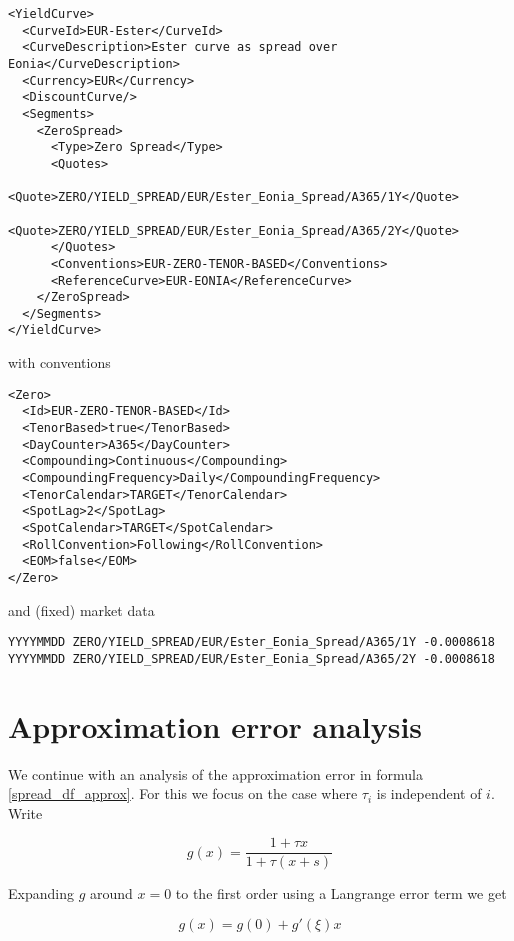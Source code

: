 \documentclass[12pt, a4paper]{article}
\begin{document}
\begin{verbatim}
<YieldCurve>
  <CurveId>EUR-Ester</CurveId>
  <CurveDescription>Ester curve as spread over Eonia</CurveDescription>
  <Currency>EUR</Currency>
  <DiscountCurve/>
  <Segments>
    <ZeroSpread>
      <Type>Zero Spread</Type>
      <Quotes>
        <Quote>ZERO/YIELD_SPREAD/EUR/Ester_Eonia_Spread/A365/1Y</Quote>
        <Quote>ZERO/YIELD_SPREAD/EUR/Ester_Eonia_Spread/A365/2Y</Quote>
      </Quotes>
      <Conventions>EUR-ZERO-TENOR-BASED</Conventions>
      <ReferenceCurve>EUR-EONIA</ReferenceCurve>
    </ZeroSpread>
  </Segments>
</YieldCurve>
\end{verbatim}

with conventions

\begin{verbatim}
<Zero>
  <Id>EUR-ZERO-TENOR-BASED</Id>
  <TenorBased>true</TenorBased>
  <DayCounter>A365</DayCounter>
  <Compounding>Continuous</Compounding>
  <CompoundingFrequency>Daily</CompoundingFrequency>
  <TenorCalendar>TARGET</TenorCalendar>
  <SpotLag>2</SpotLag>
  <SpotCalendar>TARGET</SpotCalendar>
  <RollConvention>Following</RollConvention>
  <EOM>false</EOM>
</Zero>
\end{verbatim}

and (fixed) market data

\begin{verbatim}
YYYYMMDD ZERO/YIELD_SPREAD/EUR/Ester_Eonia_Spread/A365/1Y -0.0008618
YYYYMMDD ZERO/YIELD_SPREAD/EUR/Ester_Eonia_Spread/A365/2Y -0.0008618
\end{verbatim}

\section{Approximation error analysis}\label{approx_error}

We continue with an analysis of the approximation error in formula \ref{spread_df_approx}. For this we focus on the case
where $\tau_i$ is independent of $i$. Write

\begin{equation}
  g(x) = \frac{1+\tau x}{1+\tau (x + s)}
\end{equation}

Expanding $g$ around $x=0$ to the first order using a Langrange error term we get

\begin{equation}
  g(x) = g(0) + g'(\xi) x
\end{equation}
\end{document}
